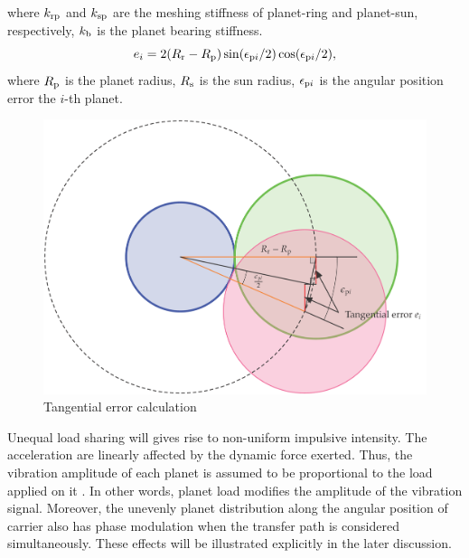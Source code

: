 \documentclass[a4paper]{cas-sc}%
\begin{document}
where $k_{\rm rp}$ and $k_{\rm sp}$ are the meshing stiffness of planet-ring and planet-sun, respectively, $k_{\rm b}$ is the planet bearing stiffness.
\begin{equation}
    e_{i}=2(R_{\rm r}-R_{\rm p})\sin(\epsilon_{{\rm p}i}/2)\cos(\epsilon_{{\rm p}i}/2),\label{eq:tangential_error}
\end{equation}
where $R_{\rm p}$ is the planet radius, $R_{\rm s}$ is the sun radius, $\epsilon_{{\rm p}i}$ is the angular position error the $i$-th planet.
\begin{figure}[pos=htbp]
    \centering
    \includegraphics[scale=0.5]{tangential_error.png}
    \caption{Tangential error calculation}
    \label{fig:tangential_error}
\end{figure}
\par Unequal load sharing will gives rise to non-uniform impulsive intensity. The acceleration are linearly affected by the dynamic force exerted. Thus, the vibration amplitude of each planet is assumed to be proportional to the load applied on it \cite{Inalpolat2009}. In other words, planet load modifies the amplitude of the vibration signal. Moreover, the unevenly planet distribution along the angular position of carrier also has phase modulation when the transfer path is considered simultaneously. These effects will be illustrated explicitly in the later discussion. 
\end{document}
